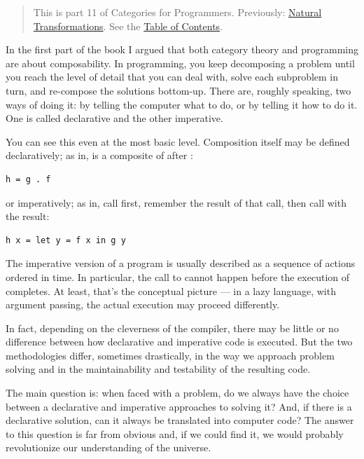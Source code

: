 \begin{quote}
This is part 11 of Categories for Programmers. Previously:
\href{https://bartoszmilewski.com/2015/04/07/natural-transformations/}{Natural
Transformations}. See the
\href{https://bartoszmilewski.com/2014/10/28/category-theory-for-programmers-the-preface/}{Table
of Contents}.
\end{quote}

In the first part of the book I argued that both category theory and
programming are about composability. In programming, you keep
decomposing a problem until you reach the level of detail that you can
deal with, solve each subproblem in turn, and re-compose the solutions
bottom-up. There are, roughly speaking, two ways of doing it: by telling
the computer what to do, or by telling it how to do it. One is called
declarative and the other imperative.

You can see this even at the most basic level. Composition itself may be
defined declaratively; as in,  is a composite of 
after :

\begin{verbatim}
h = g . f
\end{verbatim}

or imperatively; as in, call  first, remember the result of
that call, then call  with the result:

\begin{verbatim}
h x = let y = f x in g y
\end{verbatim}

The imperative version of a program is usually described as a sequence
of actions ordered in time. In particular, the call to  cannot
happen before the execution of  completes. At least, that's
the conceptual picture --- in a lazy language, with 
argument passing, the actual execution may proceed differently.

In fact, depending on the cleverness of the compiler, there may be
little or no difference between how declarative and imperative code is
executed. But the two methodologies differ, sometimes drastically, in
the way we approach problem solving and in the maintainability and
testability of the resulting code.

The main question is: when faced with a problem, do we always have the
choice between a declarative and imperative approaches to solving it?
And, if there is a declarative solution, can it always be translated
into computer code? The answer to this question is far from obvious and,
if we could find it, we would probably revolutionize our understanding
of the universe.

